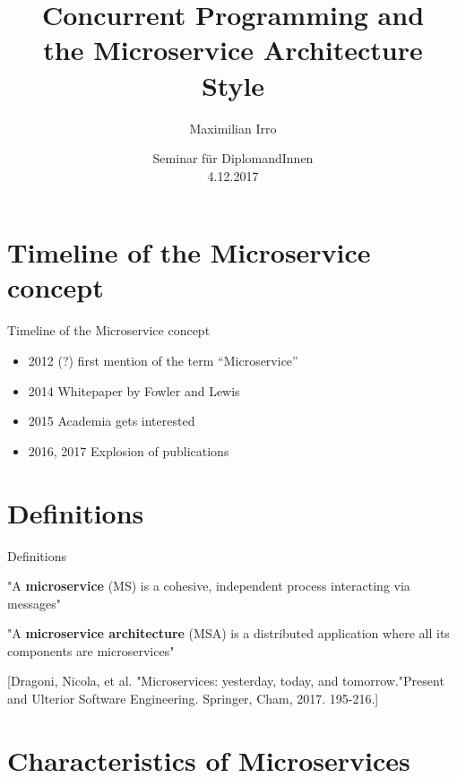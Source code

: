 \documentclass{beamer}
\title[Your Short Title]{Concurrent Programming and\\ the Microservice Architecture Style}
\author{Maximilian Irro}
\date{Seminar für DiplomandInnen\\4.12.2017}
\begin{document}
\begin{frame}
  \titlepage
\end{frame}


\section{Timeline of the Microservice concept}

\begin{frame}{Timeline of the Microservice concept}

\begin{itemize}
  \item 2012 (?) first mention of the term “Microservice”
  \item 2014 Whitepaper by Fowler and Lewis
  \item 2015 Academia gets interested
  \item 2016, 2017 Explosion of publications
\end{itemize}

\end{frame}

\section{Definitions}

\begin{frame}{Definitions}

\pause

"A \textbf{microservice} (MS) is a cohesive, independent process interacting via messages"

\pause
\vskip 1cm

"A \textbf{microservice architecture} (MSA) is a distributed application where all its components are microservices"

\vskip 2cm

\tiny{[Dragoni, Nicola, et al. "Microservices: yesterday, today, and tomorrow."Present and Ulterior Software Engineering. Springer, Cham, 2017. 195-216.]}

\end{frame}

\section{Characteristics of Microservices}
\end{document}
